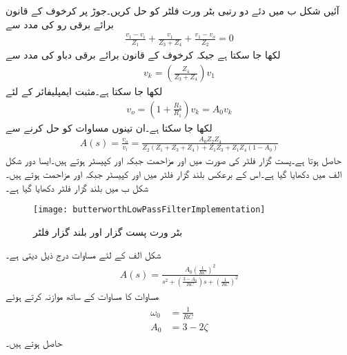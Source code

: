 آئیں شکل  ب میں دئے دو رتبی بٹر ورت فلٹر کو حل کریں۔جوڑ  پر کرخوف کے قانون برائے برقی رو کی مدد سے
\begin{align*}
\frac{v_1-v_i}{Z_1}+\frac{v_1}{Z_3+Z_4}+\frac{v_1-v_o}{Z_2}=0
\end{align*}
لکھا جا سکتا ہے جبکہ کرخوف کے قانون برائے برقی دباو کی مدد سے 
\begin{align*}
v_k= \left(\frac{Z_4}{Z_3+Z_4} \right) v_1
\end{align*}
لکھا جا سکتا ہے۔مثبت ایمپلیفائر کے لئے
\begin{align*}
v_o=\left(1+\frac{R_2}{R_1}\right) v_k=A_0 v_k
\end{align*}
لکھا جا سکتا ہے۔ان تینوں مساوات کو حل کرنے سے
\begin{align}\label{مساوات_تعددی_دو_درجی_بٹرورت_فلٹر_کی_افزائش}
A(s)=\frac{v_o}{v_i}=\frac{A_0 Z_2 Z_4}{Z_2 \left(Z_1+Z_3+Z_4 \right)+Z_1 Z_3+Z_1 Z_4 \left(1-A_0 \right)}
\end{align}
حاصل ہوتا ہے۔پست گزار فلٹر کی صورت میں  اور  مزاحمت جبکہ  اور  کپیسٹر ہوتے ہیں۔ایسا دور شکل  الف میں دکھایا گیا ہے۔اس کے برعکس بلند گزار فلٹر میں  اور  کپیسٹر جبکہ  اور  مزاحمت ہوتے ہیں۔شکل  ب میں بلند گزار فلٹر دکھایا گیا ہے۔  
\begin{figure}
\centering
\texttt{[image: butterworthLowPassFilterImplementation]}
\caption{بٹر ورت پست گزار اور بلند گزار فلٹر}
\label{شکل_تعددی_ردعمل_بٹر_ورت_فلٹر_پست_بلند_گزار}
\end{figure}

شکل  الف کے لئے مساوات  درج ذیل دیتی ہے۔
\begin{align}\label{مساوات_تعددی_دو_درجی_بٹرورت_پست_گزار_فلٹر_کی_افزائش}
A(s)=\frac{A_0 \left(\frac{1}{RC} \right)^2}{s^2+\left(\frac{3-A_0}{RC} \right) s+ \left(\frac{1}{RC} \right)^2}
\end{align}
مساوات  کا مساوات  کے ساتھ موازنہ  کرتے ہوئے
\begin{gather}
\begin{aligned}\label{مساوات_تعددی_ردعمل_بٹرورت_تخلیقی_مساوات}
\omega_0&=\frac{1}{RC}\\
A_0&=3-2 \zeta
\end{aligned}
\end{gather}
حاصل ہوتے ہیں۔

